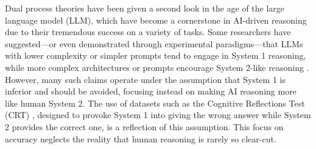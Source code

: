 
    Dual process theories have been given a second look in the age of the large language model (LLM), which have become a cornerstone in AI-driven reasoning due to their tremendous success on a variety of tasks. Some researchers have suggested---or even demonstrated through experimental paradigms---that LLMs with lower complexity or simpler prompts tend to engage in System 1 reasoning, while more complex architectures or prompts encourage System 2-like reasoning \citep{kojima_large_2022, hagendorff_human-like_2023, weston_system_2023, saha_system-1x_2024, yu_distilling_2024}. However, many such claims operate under the assumption that System 1 is inferior and should be avoided, focusing instead on making AI reasoning more like human System 2. The use of datasets such as the Cognitive Reflections Test (CRT) \citep{frederick_cognitive_2005}, designed to provoke System 1 into giving the wrong answer while System 2 provides the correct one, is a reflection of this assumption. This focus on accuracy neglects the reality that human reasoning is rarely so clear-cut.

